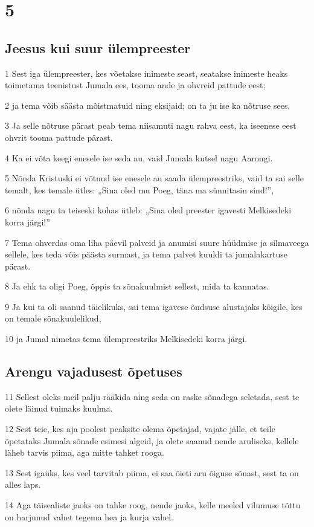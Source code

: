 \chapter{5}

\section*{Jeesus kui suur ülempreester}

\par 1 Sest iga ülempreester, kes võetakse inimeste seast, seatakse inimeste heaks toimetama teenistust Jumala ees, tooma ande ja ohvreid pattude eest;
\par 2 ja tema võib säästa mõistmatuid ning eksijaid; on ta ju ise ka nõtruse sees.
\par 3 Ja selle nõtruse pärast peab tema niisamuti nagu rahva eest, ka iseenese eest ohvrit tooma pattude pärast.
\par 4 Ka ei võta keegi enesele ise seda au, vaid Jumala kutsel nagu Aarongi.
\par 5 Nõnda Kristuski ei võtnud ise enesele au saada ülempreestriks, vaid ta sai selle temalt, kes temale ütles: „Sina oled mu Poeg, täna ma sünnitasin sind!”,
\par 6 nõnda nagu ta teiseski kohas ütleb: „Sina oled preester igavesti Melkisedeki korra järgi!”
\par 7 Tema ohverdas oma liha päevil palveid ja anumisi suure hüüdmise ja silmaveega sellele, kes teda võis päästa surmast, ja tema palvet kuuldi ta jumalakartuse pärast.
\par 8 Ja ehk ta oligi Poeg, õppis ta sõnakuulmist sellest, mida ta kannatas.
\par 9 Ja kui ta oli saanud täielikuks, sai tema igavese õndsuse alustajaks kõigile, kes on temale sõnakuulelikud,
\par 10 ja Jumal nimetas tema ülempreestriks Melkisedeki korra järgi.

\section*{Arengu vajadusest õpetuses}

\par 11 Sellest oleks meil palju rääkida ning seda on raske sõnadega seletada, sest te olete läinud tuimaks kuulma.
\par 12 Sest teie, kes aja poolest peaksite olema õpetajad, vajate jälle, et teile õpetataks Jumala sõnade esimesi algeid, ja olete saanud nende aruliseks, kellele läheb tarvis piima, aga mitte tahket rooga.
\par 13 Sest igaüks, kes veel tarvitab piima, ei saa õieti aru õiguse sõnast, sest ta on alles laps.
\par 14 Aga täisealiste jaoks on tahke roog, nende jaoks, kelle meeled vilumuse tõttu on harjunud vahet tegema hea ja kurja vahel.


